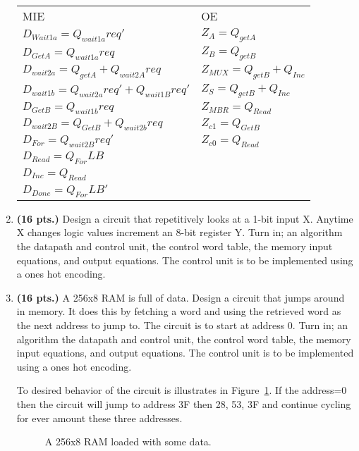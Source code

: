\begin{enumerate}
\begin{onlysolution}
{\begin{tabular}{ll}
MIE					&	OE			\\
$D_{Wait1a}= Q_{wait1a}req'$		&  $Z_{A} = Q_{getA}$		\\
$D_{GetA } = Q_{wait1a}req$		&  $Z_{B} = Q_{getB}$		\\
$D_{wait2a}= Q_{getA} + Q_{wait2A}req$	&  $Z_{MUX} = Q_{getB} + Q_{Inc}$		\\
$D_{wait1b}= Q_{wait2a}req' + Q_{wait1B}req'$	&  $Z_{S} = Q_{getB} + Q_{Inc}$		\\
$D_{GetB } = Q_{wait1b}req$		&  $Z_{MBR} = Q_{Read}$		\\
$D_{wait2B}= Q_{GetB} + Q_{wait2b}req$	&  $Z_{c1} = Q_{GetB}$		\\
$D_{For  } = Q_{wait2B}req'$		&  $Z_{c0} = Q_{Read}$		\\
$D_{Read } = Q_{For}LB$			&  		\\
$D_{Inc  } = Q_{Read}$			& 		\\
$D_{Done } = Q_{For}LB'$		&  		\\
\end{tabular}

} \end{onlysolution} 

\item  \textbf{ (16 pts.)}
Design a circuit that repetitively looks at a 1-bit input X.
Anytime X changes logic values increment an 8-bit
register Y.  
Turn in; an algorithm
the datapath and control unit,
the control word table,
the memory input equations, and
output equations.  
The control unit is to be implemented using a ones hot encoding.

\item \textbf{ (16 pts.)}
A 256x8 RAM is full of data.  Design a circuit that jumps
around in memory.  It does this by fetching a word and using the
retrieved word as the next address to jump to.  The circuit is to 
start at address 0. 
Turn in; an algorithm
the datapath and control unit,
the control word table,
the memory input equations, and
output equations.  
The control unit is to be implemented using a ones hot encoding.

To desired behavior of the circuit is illustrates in 
Figure~\ref{fig:RAMhopper}.  If the address=0 then the circuit will
jump to address 3F then 28, 53, 3F and continue cycling
for ever amount these three addresses.

\begin{figure}[ht]
\caption{A 256x8 RAM loaded with some data.}
\label{fig:RAMhopper}
\end{figure}


\end{enumerate}
